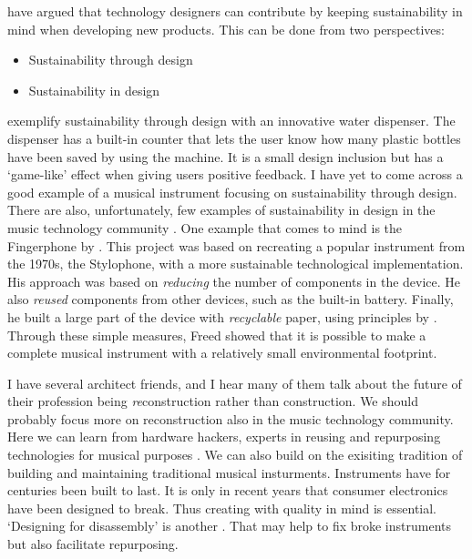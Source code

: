 \citet{mankoff_environmental_2007} have argued that technology designers can contribute by keeping sustainability in mind when developing new products. This can be done from two perspectives:

\begin{itemize}
  \item Sustainability through design
  \item Sustainability in design
\end{itemize}

\citet[p. 204]{king_understanding_2016} exemplify sustainability through design with an innovative water dispenser. The dispenser has a built-in counter that lets the user know how many plastic bottles have been saved by using the machine. It is a small design inclusion but has a `game-like' effect when giving users positive feedback.
I have yet to come across a good example of a musical instrument focusing on sustainability through design. There are also, unfortunately, few examples of sustainability in design in the music technology community \citep{masu_nime_2021}. One example that comes to mind is the Fingerphone by \citet{freed_fingerphone_2012}. This project was based on recreating a popular instrument from the 1970s, the Stylophone, with a more sustainable technological implementation. His approach was based on \emph{reducing} the number of components in the device. He also \emph{reused} components from other devices, such as the built-in battery. Finally, he built a large part of the device with \emph{recyclable} paper, using principles by \citet{koehly_fabrication_2011}. Through these simple measures, Freed showed that it is possible to make a complete musical instrument with a relatively small environmental footprint.

I have several architect friends, and I hear many of them talk about the future of their profession being \emph{re}construction rather than construction. We should probably focus more on reconstruction also in the music technology community. Here we can learn from hardware hackers, experts in reusing and repurposing technologies for musical purposes \citep{collins_handmade_2020}. We can also build on the exisiting tradition of building and maintaining traditional musical insturments. Instruments have for centuries been built to last. It is only in recent years that consumer electronics have been designed to break. Thus creating with quality in mind is essential. `Designing for disassembly' is another \citep{crowther_design_2005}. That may help to fix broke instruments but also facilitate repurposing.

